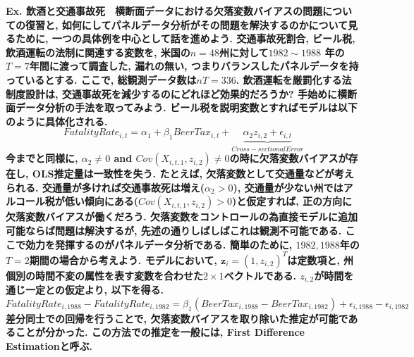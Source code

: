 \documentclass[paper=a4paper,fontsize=10pt]{jlreq}
\begin{document}
\rmfamily\mcfamily\bfseries{Ex. 飲酒と交通事故死}\mdseries　横断面データにおける欠落変数バイアスの問題についての復習と, 如何にしてパネルデータ分析がその問題を解決するのかについて見るために, 一つの具体例を中心として話を進めよう. 交通事故死割合, ビール税, 飲酒運転の法制に関連する変数を, 米国の$n = 48$州に対して$1982 \sim 1988$ 年の$T = 7$年間に渡って調査した, 漏れの無い, つまり\rmfamily\mcfamily\bfseries{バランスした}\mdseries パネルデータを持っているとする. ここで, 総観測データ数は$nT = 336$. 飲酒運転を厳罰化する法制度設計は, 交通事故死を減少するのにどれほど効果的だろうか? 手始めに横断面データ分析の手法を取ってみよう. ビール税を説明変数とすればモデルは以下のように具体化される.
\begin{equation*}
  FatalityRate_{i,t} = \alpha_1 + \beta_1 BeerTax_{i,t} + \underset{Cross-sectional Error}{\underbrace{\alpha_2z_{i,2} + \epsilon_{i,t}}}
\end{equation*}
今までと同様に, $\alpha_2 \neq 0$ and $Cov(X_{i,t,1}, z_{i,2}) \neq 0$の時に欠落変数バイアスが存在し, OLS推定量は一致性を失う. たとえば, 欠落変数として交通量などが考えられる. 交通量が多ければ交通事故死は増え($\alpha_2 > 0$), 交通量が少ない州ではアルコール税が低い傾向にある($Cov(X_{i,t,1}, z_{i,2}) > 0$)と仮定すれば, 正の方向に欠落変数バイアスが働くだろう. 欠落変数をコントロールの為直接モデルに追加可能ならば問題は解決するが, 先述の通りしばしばこれは観測不可能である. ここで効力を発揮するのがパネルデータ分析である. 簡単のために, $1982, 1988$年の$T = 2$期間の場合から考えよう. モデルにおいて, $\mathbf{z}_{i} = (1, z_{i,2})^T$は定数項と, 州個別の時間不変の属性を表す変数を合わせた$2\times1$ベクトルである. $z_{i,2}$が時間を通じ一定との仮定より, 以下を得る.
\begin{equation*}
  FatalityRate_{i,1988} - FatalityRate_{i,1982} = \beta_1 (BeerTax_{i,1988} - BeerTax_{i,1982}) + \epsilon_{i,1988} - \epsilon_{i,1982}
\end{equation*}
差分同士での回帰を行うことで, 欠落変数バイアスを取り除いた推定が可能であることが分かった. この方法での推定を一般には, \rmfamily\mcfamily\bfseries{First Difference Estimation}\mdseries と呼ぶ.\\
\end{document}
